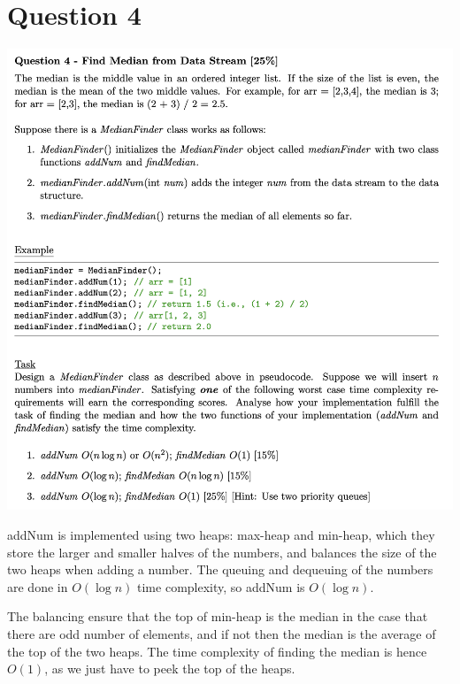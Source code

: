 \documentclass{article}
\begin{document}
\section*{Question 4}

\begin{center}
    \includegraphics[width=\linewidth]{img/4.png}
\end{center}



addNum is implemented using two heaps: max-heap and min-heap, which they store the larger and smaller halves of the numbers, and balances the size of the two heaps when adding a number. The queuing and dequeuing of the numbers are done in $O(\log n)$ time complexity, so addNum is $O(\log n)$.

The balancing ensure that the top of min-heap is the median in the case that there are odd number of elements, and if not then the median is the average of the top of the two heaps. The time complexity of finding the median is hence $O(1)$, as we just have to peek the top of the heaps.
\end{document}
